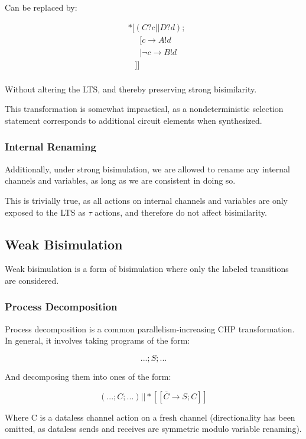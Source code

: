 \documentclass[times, 10pt]{article}
\begin{document}
Can be replaced by:

\begin{align*}
&*[(C?c || D?d); \\
& \;\;\;\;\;[ c \rightarrow A!d \\
& \;\;\;\;\;| \lnot c \rightarrow B!d \\
& \;\;\;]] \\
\end{align*}

Without altering the LTS, and thereby preserving strong bisimilarity.

This transformation is somewhat impractical, as a nondeterministic selection
statement corresponds to additional circuit elements when synthesized.

\subsubsection{Internal Renaming}

Additionally, under strong bisimulation, we are allowed to rename any internal
channels and variables, as long as we are consistent in doing so.

This is trivially true, as all actions on internal channels and variables are
only exposed to the LTS as $\tau$ actions, and therefore do not affect
bisimilarity. 

\subsection{Weak Bisimulation}

Weak bisimulation is a form of bisimulation where only the labeled transitions
are considered.

\subsubsection{Process Decomposition}

Process decomposition is a common parallelism-increasing CHP transformation.  In
general, it involves taking programs of the form:

\[
...;S;...
\]

And decomposing them into ones of the form:

\[
(...;C;...) || *[[\bar{C} \rightarrow S; C]]
\]

Where C is a dataless channel action on a fresh channel (directionality has been
omitted, as dataless sends and receives are symmetric modulo variable renaming).
\end{document}
